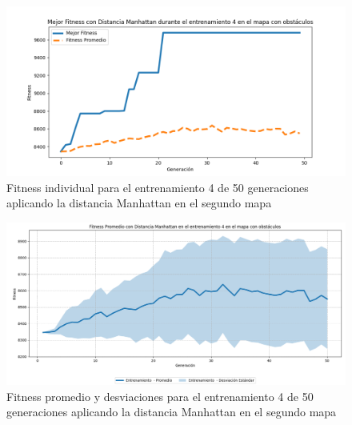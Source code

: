 \documentclass[lettersize, journal]{IEEEtran}
\begin{document}
\begin{figure}[H]
    \centering
    \includegraphics[width=0.9 \linewidth]{Manhattan/Mapa2/Fitness_4_Map2_Manh_50Gen.png}
    \caption{Fitness individual para el entrenamiento 4 de 50 generaciones aplicando la distancia Manhattan en el segundo mapa}
    \label{fig:manh_4_50_m2}
\end{figure}
\begin{figure}[H]
    \centering
    \includegraphics[width=0.9 \linewidth]{Manhattan/Mapa2/Fitness_4_Map2_Manh_50Gen_Sombra.png}
    \caption{Fitness promedio y desviaciones para el entrenamiento 4 de 50 generaciones aplicando la distancia Manhattan en el segundo mapa}
    \label{fig:manh_4_50_sombra_m2}
\end{figure}
\end{document}
